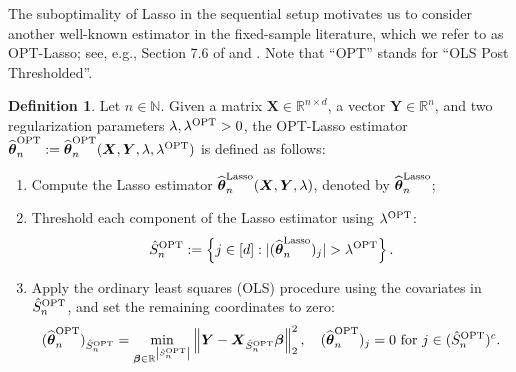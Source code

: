 \documentclass[aos,preprint]{imsart}
\theoremstyle{plain}
\theoremstyle{definition}
\newtheorem{definition}{Definition}
\newcommand{\bd}[1]{\boldsymbol{#1}}
\newcommand{\hbtheta}{\widehat{\boldsymbol{\theta}}}
\newcommand{\bX}{\boldsymbol{X}}
\newcommand{\mR}{\mathbb{R}}
\newcommand{\ltheta}{\hbtheta^{\textup{Lasso}}}
\newcommand{\hdtheta}{\hat{\theta}^{\textup{hard}}}
\newcommand{\hdbtheta}{\hat{\boldsymbol{\theta}}^{\textup{hard}}}
\newcommand{\ptheta}{\widehat{\boldsymbol{\theta}}^{\textup{OPT}}}
\newcommand{\bY}{\boldsymbol{Y}}
\newcommand{\hdlambda}{\lambda^{\textup{OPT}}}
\newcommand{\pS}{\hat{S}^{\textup{OPT}}}
\newcommand{\hdS}{\hat{S}^{\textup{OPT}}}
\newcommand{\bN}{\mathbb{N}}
\begin{document}
The suboptimality of Lasso in the sequential setup motivates us to consider another well-known estimator in the fixed-sample literature, which we refer to as OPT-Lasso; see, e.g., Section 7.6 of \cite{buhlmann2011statistics} and \cite{belloni2013least}. Note that ``OPT'' stands for ``OLS Post Thresholded''.
\begin{definition} \label{def: OPT-Lasso}
Let $n \in \bN$. Given  a matrix $\bX\in\mR^{n\times d}$, a vector $\bY\in\mR^n$, and two regularization parameters $\lambda, \hdlambda > 0$, the OPT-Lasso estimator $\ptheta_n := \ptheta_n(\bX, \bY, \lambda, \hdlambda)$ is defined as follows:
\begin{enumerate}
    \item Compute the Lasso estimator $\ltheta_n(\bX,\bY,\lambda)$, denoted by $\ltheta_n$; 
    \item Threshold each component of the Lasso estimator using $\hdlambda$: 
    \begin{align*}
        \pS_n := \left\{j \in [d]: |(\ltheta_n)_j| > \hdlambda \right\}.
    \end{align*}
    
    \item Apply the ordinary least squares (OLS) procedure using the covariates in $\hdS_n$, and set the remaining coordinates to zero:
    \begin{equation*}%
        (\ptheta_n)_{\hdS_n}=\min_{\bd{\beta}\in \mR^{\left|\hdS_n\right|}} \left\|\bY-\bX_{\hdS_n}\bd{\beta}\right\|_2^2, \quad (\ptheta_n)_j=0 \text{ for } j\in(\hdS_n)^c.
    \end{equation*}
\end{enumerate}
\end{definition}
\end{document}
